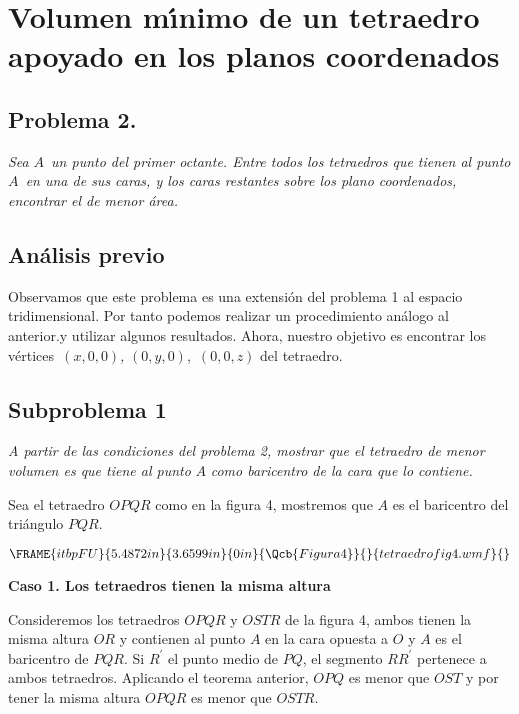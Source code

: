 \documentclass[a4paper,spanish]{article}
\begin{document}
\section{Volumen m\'{\i}nimo de un tetraedro apoyado en los planos
coordenados}

\subsection{Problema 2.}

\emph{Sea }$A$\emph{\ un punto del primer octante. Entre todos los
tetraedros que tienen al punto }$A$\emph{\ en una de sus caras, y los caras
restantes sobre los plano coordenados, encontrar el de menor \'{a}rea.}

\subsection{An\'{a}lisis previo}

Observamos que este problema es una extensi\'{o}n del problema 1 al espacio
tridimensional. Por tanto podemos realizar un procedimiento an\'{a}logo al
anterior.y utilizar algunos resultados. Ahora, nuestro objetivo es encontrar
los v\'{e}rtices\emph{\ }$\left( x,0,0\right) $\emph{, }$\left( 0,y,0\right) 
$,\emph{\ }$\left( 0,0,z\right) $ del tetraedro.

\subsection{Subproblema 1}

\emph{A partir de las condiciones del problema 2, mostrar que el tetraedro
de menor volumen es que tiene al punto }$A$ \emph{como baricentro de la cara
que lo contiene.}

Sea el tetraedro $OPQR$ como en la figura 4, mostremos que $A$ es el
baricentro del tri\'{a}ngulo $PQR.$

\[
\FRAME{itbpFU}{5.4872in}{3.6599in}{0in}{\Qcb{Figura 4}}{}{tetraedrofig4.wmf}{%
\special{language "Scientific Word";type "GRAPHIC";maintain-aspect-ratio
TRUE;display "USEDEF";valid_file "F";width 5.4872in;height 3.6599in;depth
0in;original-width 5.9171in;original-height 3.9375in;cropleft "0";croptop
"1";cropright "1";cropbottom "0";filename
'F:/Optimizacion/tetraedroFig4.wmf';file-properties "XNPEUR";}} 
\]

\textbf{Caso 1. Los tetraedros tienen la misma altura}

Consideremos los tetraedros $OPQR$ y $OSTR$ de la figura 4, ambos tienen la
misma altura $OR$ y contienen al punto $A$ en la cara opuesta a $O$ y $A$ es
el baricentro de $PQR$. Si $R^{\prime }$ el punto medio de $PQ$, el segmento 
$RR^{\prime }$ pertenece a ambos tetraedros. Aplicando el teorema anterior, $%
OPQ$ es menor que $OST$ y por tener la misma altura $OPQR$ es menor que $%
OSTR $.
\end{document}
